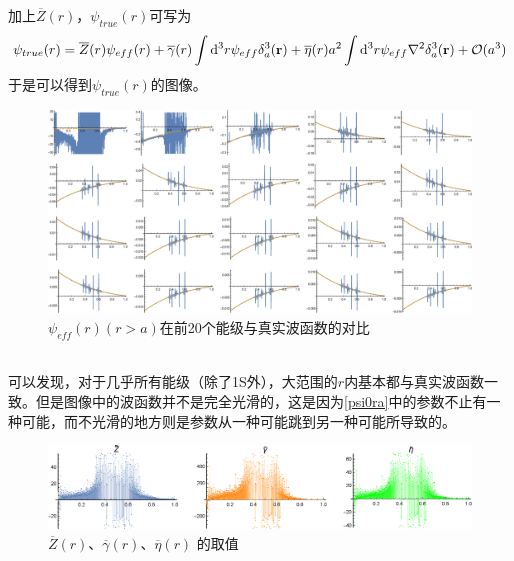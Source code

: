 \documentclass[hyperref,cs4size,titlepage]{ctexart}
\begin{document}
加上$\overline{Z}(r)$，$\psi_{true}(r)$可写为
\begin{equation}\label{psi0ra}
  \psi_{true}(r)=\overline{Z}(r)\psi_{eff}(r)+\overline{\gamma}(r)\int\dd^3r\psi_{eff}\delta^3_a(\vb{r})+\overline{\eta}(r)a^2\int\dd^3r\psi_{eff}\laplacian{\delta^3_a(\vb{r})}+\mathcal{O}(a^3)
\end{equation}
于是可以得到$\psi_{true}(r)$的图像。
\begin{figure}[!htbp]
  \centering
  \includegraphics[width=6in]{psirmodified2.eps}
  \caption{$\psi_{eff}(r)(r>a)$在前20个能级与真实波函数的对比}
\end{figure}\\
可以发现，对于几乎所有能级（除了1S外），大范围的$r$内基本都与真实波函数一致。但是图像中的波函数并不是完全光滑的，这是因为\eqref{psi0ra}中的参数不止有一种可能，而不光滑的地方则是参数从一种可能跳到另一种可能所导致的。
\begin{figure}[!htbp]
  \centering
  \includegraphics[width=6in]{psirmodified2_2.eps}
  \caption{$\overline{Z}(r)$、$\overline{\gamma}(r)$、$\overline{\eta}(r)$ 的取值}
\end{figure}
\end{document}
